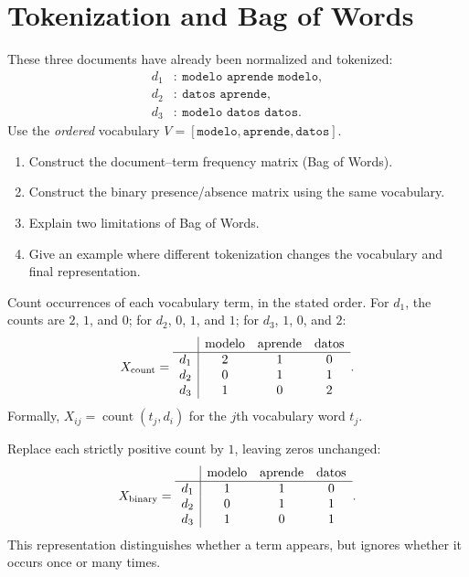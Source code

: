 \section{Tokenization and Bag of Words}
\label{sec:ex10}
\begin{problem}
These three documents have already been normalized and tokenized:
\[
\begin{aligned}
d_1&:\ \texttt{modelo aprende modelo},\\
d_2&:\ \texttt{datos aprende},\\
d_3&:\ \texttt{modelo datos datos}.
\end{aligned}
\]
Use the \emph{ordered} vocabulary $V=[\texttt{modelo},\texttt{aprende},\texttt{datos}]$.
\begin{enumerate}[label=\textbf{(\alph*)}]
\item Construct the document--term frequency matrix (Bag of Words).
\item Construct the binary presence/absence matrix using the same vocabulary.
\item Explain two limitations of Bag of Words.
\item Give an example where different tokenization changes the vocabulary and final representation.
\end{enumerate}
\end{problem}


Count occurrences of each vocabulary term, in the stated order. For $d_1$, the counts are $2$, $1$, and $0$; for $d_2$, $0$, $1$, and $1$; for $d_3$, $1$, $0$, and $2$:
\[
X_{\rm count}=\begin{array}{c|ccc}
&\text{modelo}&\text{aprende}&\text{datos}\\\hline
 d_1&2&1&0\\
 d_2&0&1&1\\
 d_3&1&0&2
\end{array}.
\]
Formally, $X_{ij}=\operatorname{count}(t_j,d_i)$ for the $j$th vocabulary word $t_j$.

Replace each strictly positive count by $1$, leaving zeros unchanged:
\[
X_{\rm binary}=\begin{array}{c|ccc}
&\text{modelo}&\text{aprende}&\text{datos}\\\hline
 d_1&1&1&0\\
 d_2&0&1&1\\
 d_3&1&0&1
\end{array}.
\]
This representation distinguishes whether a term appears, but ignores whether it occurs once or many times.

